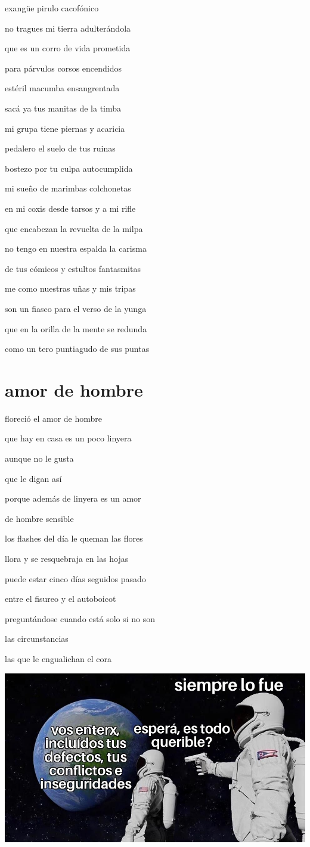 \documentclass[
]{book}
\begin{document}
exangüe pirulo cacofónico

no tragues mi tierra adulterándola

que es un corro de vida prometida

para párvulos corsos encendidos

estéril macumba ensangrentada

sacá ya tus manitas de la timba

mi grupa tiene piernas y acaricia

pedalero el suelo de tus ruinas

bostezo por tu culpa autocumplida

mi sueño de marimbas colchonetas

en mi coxis desde tarsos y a mi rifle

que encabezan la revuelta de la milpa

no tengo en nuestra espalda la carisma

de tus cómicos y estultos fantasmitas

me como nuestras uñas y mis tripas

son un fiasco para el verso de la yunga

que en la orilla de la mente se redunda

como un tero puntiagudo de sus puntas

\hypertarget{amor-de-hombre}{%
\chapter{amor de hombre}\label{amor-de-hombre}}

floreció el amor de hombre

que hay en casa es un poco linyera

aunque no le gusta

que le digan así

porque además de linyera es un amor

de hombre sensible

los flashes del día le queman las flores

llora y se resquebraja en las hojas

puede estar cinco días seguidos pasado

entre el fisureo y el autoboicot

preguntándose cuando está solo si no son

las circunstancias

las que le engualichan el cora

\includegraphics{images/9.png}
\end{document}
